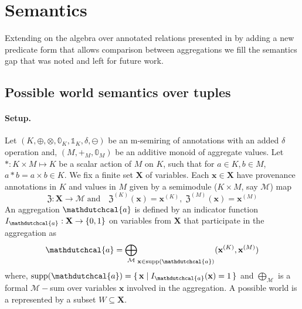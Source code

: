 \section{Semantics}
Extending on the algebra over annotated 
relations presented in \cite{sen2025provsqlgeneralkeepingtrack} by 
adding a new predicate form that allows 
comparison between aggregations we fill the semantics gap that 
was noted and left for future work.
\subsection{Possible world semantics over tuples}
\paragraph{Setup.}
Let $(K,\oplus,\otimes,\mathbb{0}_K,\mathbb{1}_K,\delta,\ominus)$ be an m-semiring of annotations with an 
added $\delta$ operation and, $(M,+_M,\mathbb{0}_M)$ be an 
additive monoid of aggregate values. Let $*:K\times M \mapsto K$ be a scalar action of $M$ on $K$, such that for $a \in K, b \in M$, 
$a * b = a \times b \in K$.
We fix a finite set $\mathbf{X}$ of variables. Each $\mathbf{x}\in\mathbf{X}$ have provenance annotations in $K$ and values in $M$ 
given by a semimodule ($K\times M$, say $\mathcal{M}$) map 
\[
\mathfrak{Z}:\mathbf{X}\rightarrow \mathcal{M}\; \text{and} \quad \mathfrak{Z}^{(K)}(\mathbf{x})=\mathbf{x}^{(K)}, \; \mathfrak{Z}^{(M)}(\mathbf{x})=\mathbf{x}^{(M)}
\]
An aggregation $\mathdutchcal{a}$ is defined by an indicator function 
$I_\mathdutchcal{a}:\mathbf{X}\rightarrow \{0,1\}$
on variables from $\mathbf{X}$ that participate in the aggregation as 
\[
\mathdutchcal{a} = {\bigoplus_\mathcal{M}}_{\mathbf{x}\in \mathrm{supp}(\mathdutchcal{a})}(\mathbf{x}^{(K)},\mathbf{x}^{(M)})
\]
where, 
$\mathrm{supp}(\mathdutchcal{a})=\{\,\mathbf{x} \mid I_\mathdutchcal{a}(\mathbf{x})=1 \,\}$ and 
$\bigoplus_{\mathcal{M}}$ is a formal $\mathcal{M}-$sum over 
variables $\mathbf{x}$ involved in the aggregation.
A possible world is a represented by a subset $W\subseteq\mathbf{X}$.
